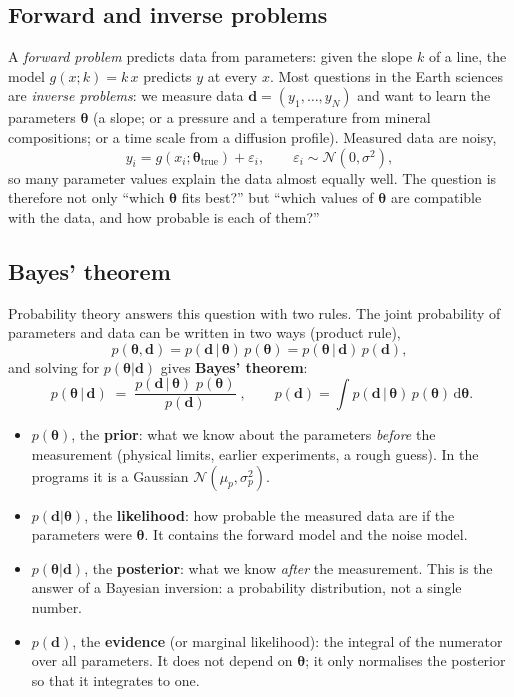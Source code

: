 \documentclass[11pt,a4paper]{article}
\newcommand{\dd}{\mathrm{d}}
\newcommand{\vth}{\boldsymbol{\theta}}
\newcommand{\vd}{\mathbf{d}}
\begin{document}
\subsection{Forward and inverse problems}
A \emph{forward problem} predicts data from parameters: given the slope $k$ of a line, the model
$g(x;k)=k\,x$ predicts $y$ at every $x$. Most questions in the Earth sciences are \emph{inverse problems}: we
measure data $\vd=(y_1,\dots,y_N)$ and want to learn the parameters $\vth$ (a slope; or a pressure and a
temperature from mineral compositions; or a time scale from a diffusion profile). Measured data are noisy,
\begin{equation}
  y_i = g(x_i;\vth_\text{true}) + \varepsilon_i ,\qquad \varepsilon_i \sim \mathcal{N}(0,\sigma^2),
  \label{eq:data}
\end{equation}
so many parameter values explain the data almost equally well. The question is therefore not only ``which
$\vth$ fits best?'' but ``which values of $\vth$ are compatible with the data, and how probable is each of
them?''

\subsection{Bayes' theorem}
Probability theory answers this question with two rules. The joint probability of parameters and data can be
written in two ways (product rule),
\begin{equation}
  p(\vth,\vd) = p(\vd\,|\,\vth)\,p(\vth) = p(\vth\,|\,\vd)\,p(\vd),
\end{equation}
and solving for $p(\vth|\vd)$ gives \textbf{Bayes' theorem}:
\begin{equation}
  \boxed{\;p(\vth\,|\,\vd) \;=\; \frac{p(\vd\,|\,\vth)\;p(\vth)}{p(\vd)}\;},\qquad
  p(\vd) = \int p(\vd\,|\,\vth)\,p(\vth)\,\dd\vth .
  \label{eq:bayes}
\end{equation}
\begin{itemize}
\item $p(\vth)$, the \textbf{prior}: what we know about the parameters \emph{before} the measurement (physical
  limits, earlier experiments, a rough guess). In the programs it is a Gaussian $\mathcal{N}(\mu_p,\sigma_p^2)$.
\item $p(\vd|\vth)$, the \textbf{likelihood}: how probable the measured data are if the parameters were $\vth$.
  It contains the forward model and the noise model.
\item $p(\vth|\vd)$, the \textbf{posterior}: what we know \emph{after} the measurement. This is the answer of a
  Bayesian inversion: a probability distribution, not a single number.
\item $p(\vd)$, the \textbf{evidence} (or marginal likelihood): the integral of the numerator over all
  parameters. It does not depend on $\vth$; it only normalises the posterior so that it integrates to one.
\end{itemize}
\end{document}
